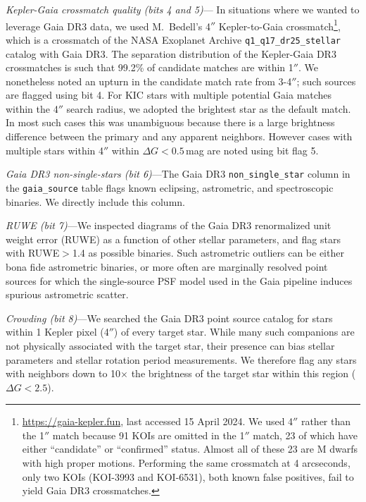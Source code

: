 \documentclass[11pt,twocolumn,tighten]{aastex63}
\begin{document}
{\it Kepler-Gaia crossmatch quality (bits 4 and 5)}--- In situations
where we wanted to leverage Gaia DR3 data, we used M.~Bedell's 4$''$
Kepler-to-Gaia crossmatch\footnote{\url{https://gaia-kepler.fun}, last
accessed 15 April 2024.  We used 4$''$ rather than the 1$''$ match
because 91 KOIs are omitted in the 1$''$ match, 23 of which have
either ``candidate'' or ``confirmed'' status.  Almost all of these 23
are M dwarfs with high proper motions.  Performing the same crossmatch
at 4 arcseconds, only two KOIs (KOI-3993 and KOI-6531), both known
false positives, fail to yield Gaia DR3 crossmatches.}, which is a
crossmatch of the NASA Exoplanet Archive
\texttt{q1\_q17\_dr25\_stellar} catalog with Gaia DR3.  The separation
distribution of the Kepler-Gaia DR3 crossmatches is such that 99.2\%
of candidate matches are within 1$''$.   We nonetheless noted an
upturn in the candidate match rate from 3-4$''$; such sources are
flagged using bit 4.  For KIC stars with multiple potential Gaia
matches within the 4$''$ search radius, we adopted the brightest star
as the default match.  In most such cases this was unambiguous because
there is a large brightness difference between the primary and any
apparent neighbors.  However cases with multiple stars within 4$''$
within $\Delta G$$<$$0.5$\,mag are noted using bit flag 5.  

{\it Gaia DR3 non-single-stars (bit 6)}---The Gaia DR3
\texttt{non\_single\_star} column in the \texttt{gaia\_source} table
flags known eclipsing, astrometric, and spectroscopic binaries.  We
directly include this column.

{\it RUWE (bit 7)}---We inspected diagrams of the Gaia DR3 renormalized
unit weight error
(RUWE) as a function of other stellar parameters, %
and flag stars with RUWE$>$1.4 as possible binaries.  Such astrometric
outliers can be either bona fide astrometric binaries, or more often
are marginally resolved point sources for which the single-source PSF
model used in the Gaia pipeline induces spurious astrometric scatter.

{\it Crowding (bit 8)}---We searched the Gaia DR3 point source catalog
for stars within 1 Kepler pixel (4$''$) of every target star.  While
many such companions are not physically associated with the target
star, their presence can bias stellar parameters and stellar rotation
period measurements.  We therefore flag any stars with neighbors down
to 10$\times$ the brightness of the target star within this region
($\Delta G < 2.5$).
\end{document}
